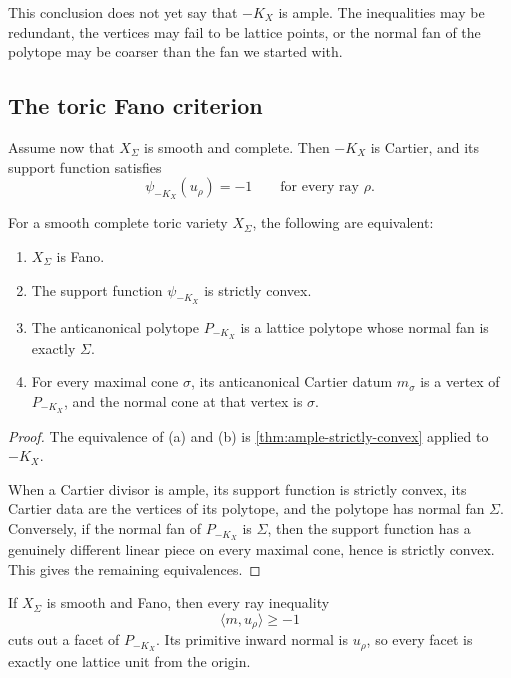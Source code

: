 This conclusion does not yet say that \(-K_X\) is ample. The
inequalities may be redundant, the vertices may fail to be lattice
points, or the normal fan of the polytope may be coarser than the fan
we started with.

\subsection{The toric Fano criterion}

Assume now that \(X_\Sigma\) is smooth and complete. Then \(-K_X\) is
Cartier, and its support function satisfies
\[
\psi_{-K_X}(u_\rho)=-1
\qquad
\text{for every ray }\rho.
\]

\begin{theorem}
\label{thm:toric-fano-criterion}
For a smooth complete toric variety \(X_\Sigma\), the following are
equivalent:

\begin{enumerate}[label=(\alph*),wide=0pt]
\item \(X_\Sigma\) is Fano.

\item The support function \(\psi_{-K_X}\) is strictly convex.

\item The anticanonical polytope \(P_{-K_X}\) is a lattice polytope
whose normal fan is exactly \(\Sigma\).

\item For every maximal cone \(\sigma\), its anticanonical Cartier
datum \(m_\sigma\) is a vertex of \(P_{-K_X}\), and the normal cone at
that vertex is \(\sigma\).
\end{enumerate}
\end{theorem}

\begin{proof}
The equivalence of \textup{(a)} and \textup{(b)} is
\cref{thm:ample-strictly-convex} applied to \(-K_X\).

When a Cartier divisor is ample, its support function is strictly
convex, its Cartier data are the vertices of its polytope, and the
polytope has normal fan \(\Sigma\). Conversely, if the normal fan of
\(P_{-K_X}\) is \(\Sigma\), then the support function has a genuinely
different linear piece on every maximal cone, hence is strictly
convex. This gives the remaining equivalences.
\end{proof}

\begin{corollary}
\label{cor:fano-facets-distance-one}
If \(X_\Sigma\) is smooth and Fano, then every ray inequality
\[
\langle m,u_\rho\rangle\geq-1
\]
cuts out a facet of \(P_{-K_X}\). Its primitive inward normal is
\(u_\rho\), so every facet is exactly one lattice unit from the
origin.
\end{corollary}

